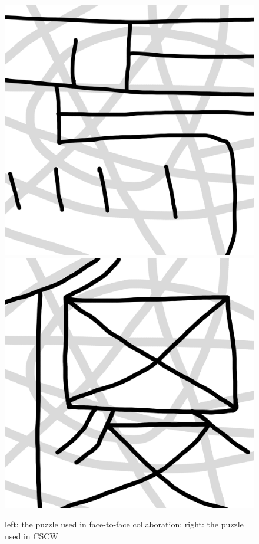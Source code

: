 \documentclass[12pt,twoside]{article}
\begin{document}
\begin{figure}[h!]
\centering
\includegraphics[scale=0.2]{img/user_task_puzzle1.jpg}\hspace{1cm}
\includegraphics[scale=0.2]{img/user_task_puzzle2.jpg}
\caption{left: the puzzle used in face-to-face collaboration; right: the puzzle used in CSCW}
\label{fig:field_task1}
\end{figure}
\end{document}
